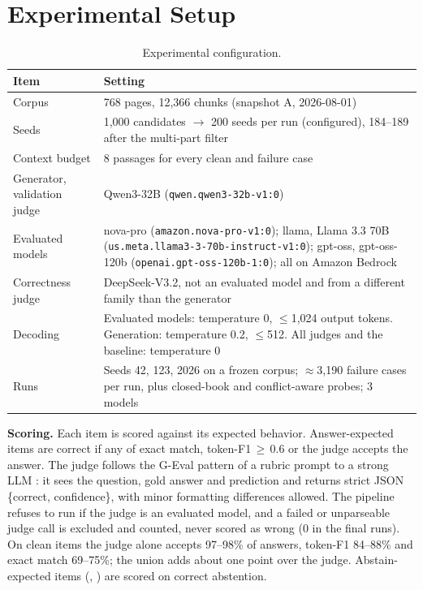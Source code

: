 \documentclass[conference]{IEEEtran}
\newcommand{\op}[1]{\texttt{\detokenize{#1}}}
\begin{document}
\section{Experimental Setup}
\begin{table}[t]
\centering
\caption{Experimental configuration.}
\label{tab:config}
\footnotesize
\begin{tabular}{@{}p{}p{}@{}}
\toprule
Item & Setting \\
\midrule
Corpus & 768 pages, 12,366 chunks (snapshot A, 2026-08-01) \\
Seeds & 1,000 candidates $\to$ 200 seeds per run (configured), 184--189 after the multi-part filter \\
Context budget & 8 passages for every clean and failure case \\
Generator, validation judge & Qwen3-32B (\texttt{qwen.qwen3-32b-v1:0}) \\
Evaluated models & nova-pro (\texttt{amazon.nova-pro-v1:0}); llama, Llama 3.3 70B (\texttt{us.meta.llama3-3-70b-instruct-v1:0}); gpt-oss, gpt-oss-120b (\texttt{openai.gpt-oss-120b-1:0}); all on Amazon Bedrock \\
Correctness judge & DeepSeek-V3.2, not an evaluated model and from a different family than the generator \\
Decoding & Evaluated models: temperature 0, $\le$1,024 output tokens. Generation: temperature 0.2, $\le$512. All judges and the baseline: temperature 0 \\
Runs & Seeds 42, 123, 2026 on a frozen corpus; $\approx$3,190 failure cases per run, plus closed-book and conflict-aware probes; 3 models \\
\bottomrule
\end{tabular}
\end{table}

\textbf{Scoring.} Each item is scored against its expected behavior. Answer-expected items are
correct if any of exact match, token-F1\,$\ge$\,0.6 or the judge accepts the answer. The judge
follows the G-Eval pattern of a rubric prompt to a strong LLM \cite{liu2023geval}: it sees the
question, gold answer and prediction and returns strict JSON \{correct, confidence\}, with
minor formatting differences allowed. The pipeline refuses to run if the judge is an evaluated
model, and a failed or unparseable judge call is excluded and counted, never scored as wrong
(0 in the final runs). On clean items the judge alone accepts 97--98\% of answers, token-F1
84--88\% and exact match 69--75\%; the union adds about one point over the judge. Abstain-expected
items (\op{missing_evidence}, \op{hard_negative}) are scored on correct abstention.
\end{document}
